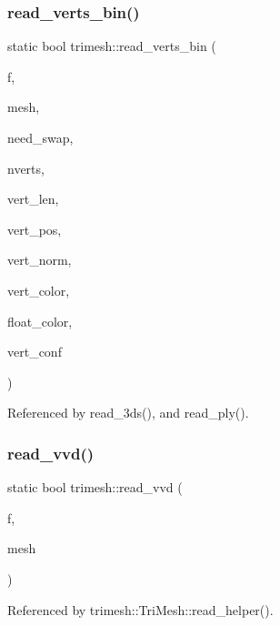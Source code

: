 \subsubsection{\texorpdfstring{read\+\_\+verts\+\_\+bin()}{read\_verts\_bin()}}
{\footnotesize\ttfamily static bool trimesh\+::read\+\_\+verts\+\_\+bin (\begin{DoxyParamCaption}\item[{F\+I\+LE $\ast$}]{f,  }\item[{\hyperlink{classtrimesh_1_1TriMesh}{Tri\+Mesh} $\ast$}]{mesh,  }\item[{bool \&}]{need\+\_\+swap,  }\item[{int}]{nverts,  }\item[{int}]{vert\+\_\+len,  }\item[{int}]{vert\+\_\+pos,  }\item[{int}]{vert\+\_\+norm,  }\item[{int}]{vert\+\_\+color,  }\item[{bool}]{float\+\_\+color,  }\item[{int}]{vert\+\_\+conf }\end{DoxyParamCaption})\hspace{0.3cm}{\ttfamily [static]}}



Referenced by read\+\_\+3ds(), and read\+\_\+ply().

\mbox{\label{namespacetrimesh_a388de28d8189208fbaa377ffedc14cb8}} 
\subsubsection{\texorpdfstring{read\+\_\+vvd()}{read\_vvd()}}
{\footnotesize\ttfamily static bool trimesh\+::read\+\_\+vvd (\begin{DoxyParamCaption}\item[{F\+I\+LE $\ast$}]{f,  }\item[{\hyperlink{classtrimesh_1_1TriMesh}{Tri\+Mesh} $\ast$}]{mesh }\end{DoxyParamCaption})\hspace{0.3cm}{\ttfamily [static]}}



Referenced by trimesh\+::\+Tri\+Mesh\+::read\+\_\+helper().

\mbox{\label{namespacetrimesh_a796f7912ace3eb4d8302f87fa64de391}} 
